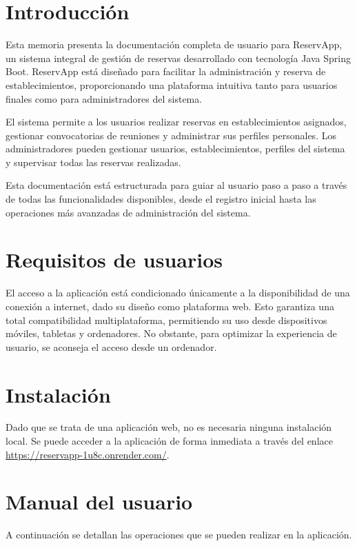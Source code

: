 
\section{Introducción}
Esta memoria presenta la documentación completa de usuario para ReservApp, un sistema integral de gestión de reservas desarrollado con tecnología Java Spring Boot. ReservApp está diseñado para facilitar la administración y reserva de establecimientos, proporcionando una plataforma intuitiva tanto para usuarios finales como para administradores del sistema.

El sistema permite a los usuarios realizar reservas en establecimientos asignados, gestionar convocatorias de reuniones y administrar sus perfiles personales. Los administradores pueden gestionar usuarios, establecimientos, perfiles del sistema y supervisar todas las reservas realizadas.

Esta documentación está estructurada para guiar al usuario paso a paso a través de todas las funcionalidades disponibles, desde el registro inicial hasta las operaciones más avanzadas de administración del sistema.

\section{Requisitos de usuarios}
El acceso a la aplicación está condicionado únicamente a la disponibilidad de una conexión a internet, dado su diseño como plataforma web. Esto garantiza una total compatibilidad multiplataforma, permitiendo su uso desde dispositivos móviles, tabletas y ordenadores. No obstante, para optimizar la experiencia de usuario, se aconseja el acceso desde un ordenador.

\section{Instalación}
Dado que se trata de una aplicación web, no es necesaria ninguna instalación local. Se puede acceder a la aplicación de forma inmediata a través del enlace \url{https://reservapp-1u8c.onrender.com/}.

\newpage

\section{Manual del usuario}
A continuación se detallan las operaciones que se pueden realizar en la aplicación.

